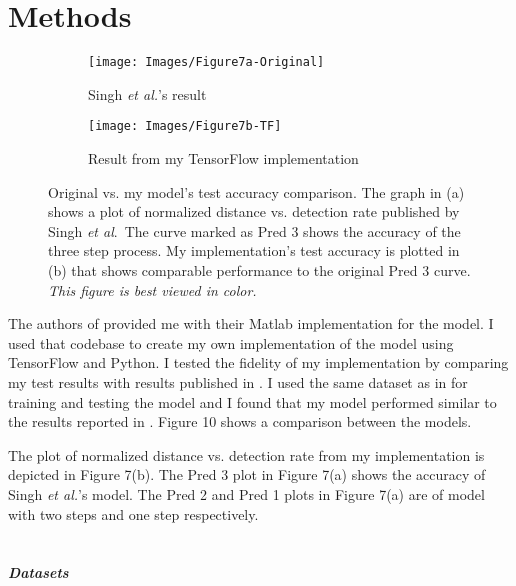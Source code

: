 \documentclass [11pt,letterpaper ,twoside ,openany ]{report}
\begin{document}
    \chapter{Methods}
    \doublespacing

    \begin{wrapfigure}{l}[9mm]{0.55\textwidth}
        \centering
        \begin{subfigure}[b]{\linewidth}
            \texttt{[image: Images/Figure7a-Original]}
            \caption{Singh \textit{et al.}'s result \cite{Singh_2016_CVPR}}
        \end{subfigure}
        \begin{subfigure}[b]{\linewidth}
            \texttt{[image: Images/Figure7b-TF]}
            \caption{Result from my TensorFlow implementation}
        \end{subfigure}
        \caption{Original vs. my model's test accuracy comparison. The graph in (a) shows a plot of normalized distance vs. detection rate published by Singh \textit{et al}.\ The curve marked as Pred 3 shows the accuracy of the three step process. My implementation's test accuracy is plotted in (b) that shows comparable performance to the original Pred 3 curve. \textit{This figure is best viewed in color.}}
        \label{fig:compare.}
    \end{wrapfigure}       


    The authors of \cite{Singh_2016_CVPR} provided me with their Matlab implementation for the model. I used that codebase to create my own implementation of the model using TensorFlow and Python. I tested the fidelity of my implementation by comparing my test results with results published in \cite{Singh_2016_CVPR}. I used the same dataset as in \cite{Singh_2016_CVPR} for training and testing the model and I found that my model performed similar to the results reported in \cite{Singh_2016_CVPR}. Figure 10 shows a comparison between the models.

    The plot of normalized distance vs. detection rate from my implementation is depicted in Figure 7(b). The Pred 3 plot in Figure 7(a) shows the accuracy of Singh \textit{et al.}'s model. The Pred 2 and Pred 1 plots in Figure 7(a) are of model with two steps and one step respectively.\\\\\\

    \noindent
    \textbf{\textit{Datasets}}
\end{document}

